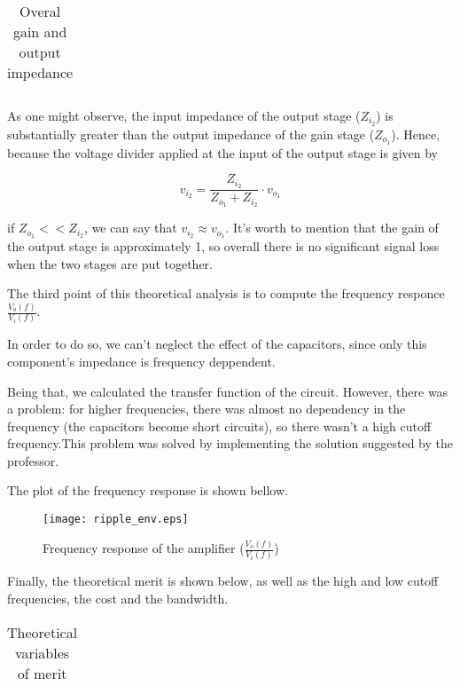 \begin{table}[H]
	\centering
	\begin{tabularx}{0.9\textwidth} {
 	    | >{\raggedright\arraybackslash}X
  	    | >{\raggedleft\arraybackslash}X | }
	\hline
	
	\end{tabularx}
	\caption{Overal gain and output impedance}
	\label{tab:overall}
\end{table}
\vspace{5mm}

\par As one might observe, the input impedance of the output stage ($Z_{i_2}$) is substantially greater than the output impedance of the gain stage ($Z_{o_1}$). Hence, because the voltage divider applied at the input of the output stage is given by

\begin{equation}
	v_{i_2}= \frac{Z_{i_2}}{Z_{o_1}+Z_{i_2}} \cdot v_{o_1}
\end{equation}

\noindent if $Z_{o_1}<<Z_{i_2}$, we can say that $v_{i_2} \approx v_{o_1}$. It's worth to mention that the gain of the output stage is approximately 1, so overall there is no significant signal loss when the two stages are put together.

\par The third point of this theoretical analysis is to compute the frequency responce $\frac{V_o(f)}{V_i(f)}$. 
\par In order to do so, we can't neglect the effect of the capacitors, since only this component's impedance is frequency deppendent.
\par Being that, we calculated the transfer function of the circuit. However, there was a problem: for higher frequencies, there was almost no dependency in the frequency (the capacitors become short circuits), so there wasn't a high cutoff frequency.This problem was solved by implementing the solution suggested by the professor.
\par The plot of the frequency response is shown bellow.

\begin{figure}[H] 
	\centering
	\texttt{[image: ripple\_env.eps]}
	\caption{Frequency response of the amplifier ($\frac{V_o(f)}{V_i(f)}$)}
\end{figure}

\par Finally, the theoretical merit is shown below, as well as the high and low cutoff frequencies, the cost and the bandwidth.

\vspace{5mm}
\begin{table}[H]
	\centering
	\begin{tabularx}{0.9\textwidth} {
 	    | >{\raggedright\arraybackslash}X
  	    | >{\raggedleft\arraybackslash}X | }
	\hline
	
	\end{tabularx}
	\caption{Theoretical variables of merit}
	\label{tab:merit1}
\end{table}
\vspace{5mm}

